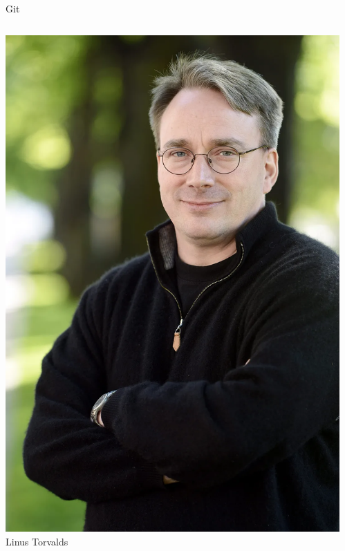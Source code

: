 \documentclass{beamer}
\begin{document}
\begin{frame}{Git}
	\begin{columns}
		\begin{center}
			\includegraphics[scale=0.1]{torvalds.jpg}\\
			Linus Torvalds
		\end{center}
		\begin{center}

\end{center}
\end{columns}
\end{frame}
\end{document}
